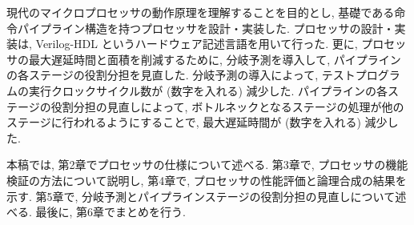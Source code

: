 \documentclass[../main.tex]{subfiles}
\begin{document}
  現代のマイクロプロセッサの動作原理を理解することを目的とし, 
  基礎である命令パイプライン構造を持つプロセッサを設計・実装した.
  プロセッサの設計・実装は, Verilog-HDL というハードウェア記述言語を用いて行った.
  更に, プロセッサの最大遅延時間と面積を削減するために, 
  分岐予測を導入して, パイプラインの各ステージの役割分担を見直した.
  分岐予測の導入によって, テストプログラムの実行クロックサイクル数が (数字を入れる) 減少した.%
  パイプラインの各ステージの役割分担の見直しによって, 
  ボトルネックとなるステージの処理が他のステージに行われるようにすることで, 
  最大遅延時間が (数字を入れる) 減少した. %

  本稿では, 第2章でプロセッサの仕様について述べる.
  第3章で, プロセッサの機能検証の方法について説明し, 
  第4章で, プロセッサの性能評価と論理合成の結果を示す.
  第5章で, 分岐予測とパイプラインステージの役割分担の見直しについて述べる.
  最後に, 第6章でまとめを行う.
\end{document}
